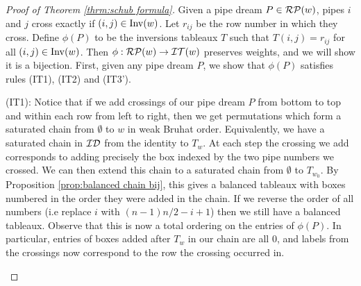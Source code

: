 \documentclass{article}
\theoremstyle{definition}
\begin{document}
\begin{proof}[Proof of Theorem \ref{thrm:schub formula}]
Given a pipe dream $P \in \mathcal{RP}(w)$, pipes $i$ and $j$ cross exactly if $(i,j) \in \mathrm{Inv}(w)$. Let $r_{ij}$ be the row number in which they cross. Define $\phi(P)$ to be the inversions tableaux $T$ such that $T(i,j) = r_{ij}$ for all $(i,j) \in \mathrm{Inv}(w)$. Then $\phi: \mathcal{RP}(w) \rightarrow \mathcal{IT}(w)$ preserves weights, and we will show it is a bijection.
    First, given any pipe dream $P$, we show that $\phi(P)$ satisfies rules (IT1), (IT2) and (IT3'). 
    
    (IT1): Notice that if we add crossings of our pipe dream $P$ from bottom to top and within each row from left to right, then we get permutations which form a saturated chain from $\emptyset$ to $w$ in weak Bruhat order.  Equivalently, we have a saturated chain in $\mathcal{ID}_{}$ from the identity to $T_w$.
    At each step the crossing we add corresponds to adding precisely the box indexed by the two pipe numbers we crossed. We can then extend this chain to a saturated chain from $\emptyset$ to $T_{w_0}$. By Proposition \ref{prop:balanced chain bij}, this gives a balanced tableaux with boxes numbered in the order they were added in the chain. If we reverse the order of all numbers (i.e replace $i$ with $(n-1)n/2-i+1$) then we still have a balanced tableaux. Observe that this is now a total ordering on the entries of $\phi(P)$. In particular, entries of boxes added after $T_w$ in our chain are all 0, and labels from the crossings now correspond to the row the crossing occurred in.

\iffalse
  \begin{figure}[h]
        \centering
    

\end{figure}
\end{proof}
\end{document}
